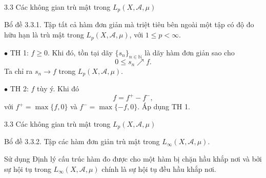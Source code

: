 \documentclass[notheorems,envcountsect,hyperref=unicode]{beamer}
\newcommand{\N}{\mathbb N}
\def\A{\mathcal{A}}
\def\N{\mathbb{N}}
\def\Lpp{\mathit{L_p}}
\def\Loo{\mathit{L_{\infty}}}
\def\dissum{\displaystyle\sum}
\def\van{triệt tiêu bên ngoài một tập có độ đo hữu hạn }
\def\kgdd{(X,\A,\mu)}
\begin{document}
\begin{frame}{3.3 Các không gian trù mật trong $\Lpp\kgdd$ }

%
%
\begin{block}{\textnormal{Bổ đề 3.3.1.}}
Tập tất cả hàm đơn giản mà \van là trù mật trong $\Lpp\kgdd$, với $1\leq p<\infty$.
\end{block}

$\bullet$ TH 1: $f\geq 0$. Khi đó, tồn tại dãy $\lbrace s_n\rbrace_{n\in \N}$ là dãy hàm đơn giản sao cho  $$0\leq s_n \nearrow f.$$ Ta chỉ ra $s_n \to f$ trong $\Lpp\kgdd$.

$\bullet$ TH 2: $f$ tùy ý. Khi đó $$f=f^+-f^-,$$ với $f^+=\max{\lbrace f,0\rbrace}$ và $f^-=\max{\lbrace -f,0\rbrace}$. Áp dụng TH 1.
\end{frame}

\begin{frame}{3.3 Các không gian trù mật trong $\Lpp\kgdd$ }
\begin{block}{\textnormal{Bổ đề 3.3.2.}}
Tập các hàm đơn giản trù mật trong $\Loo\kgdd$.
\end{block}

Sử dụng Định lý cấu trúc hàm đo được cho một hàm bị chặn hầu khắp nơi và bởi sự hội tụ trong $\Loo\kgdd$ chính là sự hội tụ đều hầu khắp nơi.
\end{frame}

\end{document}
